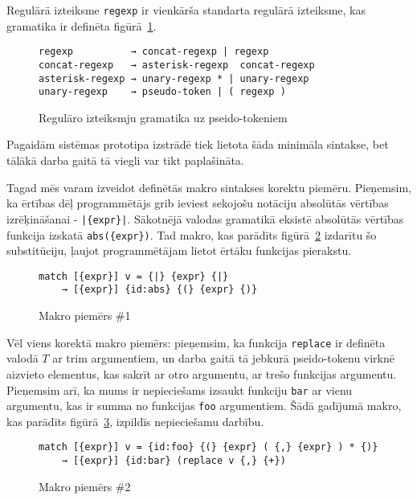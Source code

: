 Regulārā izteiksme \verb|regexp| ir vienkārša standarta regulārā izteiksme, kas gramatika ir definēta figūrā~\ref{fig:regexpsyntax}.

\begin{figure}[h!]
\begin{verbatim}
regexp          → concat-regexp | regexp
concat-regexp   → asterisk-regexp  concat-regexp
asterisk-regexp → unary-regexp * | unary-regexp
unary-regexp    → pseudo-token | ( regexp )
\end{verbatim}
\caption{\label{fig:regexpsyntax}Regulāro izteiksmju gramatika uz pseido-tokeniem}
\end{figure}

Pagaidām sistēmas prototipa izstrādē tiek lietota šāda minimāla sintakse, bet tālākā darba gaitā tā viegli var tikt paplašināta.

Tagad mēs varam izveidot definētās makro sintakses korektu piemēru. Pieņemsim, ka ērtības dēļ programmētājs grib ieviest sekojošu notāciju absolūtās vērtības izrēķināšanai - \verb/|{expr}|/. Sākotnējā valodas gramatikā eksistē absolūtās vērtības funkcija izskatā \verb|abs({expr})|. Tad makro, kas parādīts figūrā~\ref{fig:matchsample1} izdarītu šo substitūciju, ļaujot programmētājam lietot ērtāku funkcijas pierakstu.

\begin{figure}[h!]
\begin{verbatim}
match [{expr}] v = {|} {expr} {|}
    → [{expr}] {id:abs} {(} {expr} {)}
\end{verbatim}
\caption{\label{fig:matchsample1}Makro piemērs \#1}
\end{figure}

Vēl viens korektā makro piemērs: pieņemsim, ka funkcija \verb|replace| ir definēta valodā $T$ ar trim argumentiem, un darba gaitā tā jebkurā pseido-tokenu virknē aizvieto elementus, kas sakrīt ar otro argumentu, ar trešo funkcijas argumentu. Pieņemsim arī, ka mums ir nepieciešams izsaukt funkciju \verb|bar| ar vienu argumentu, kas ir summa no funkcijas \verb|foo| argumentiem. Šādā gadījumā makro, kas parādīts figūrā~\ref{fig:matchsample2}, izpildīs nepieciešamu darbību.

\begin{figure}[h!]
\begin{verbatim}
match [{expr}] v = {id:foo} {(} {expr} ( {,} {expr} ) * {)}
    → [{expr}] {id:bar} (replace v {,} {+})
\end{verbatim}
\caption{\label{fig:matchsample2}Makro piemērs \#2}
\end{figure}

